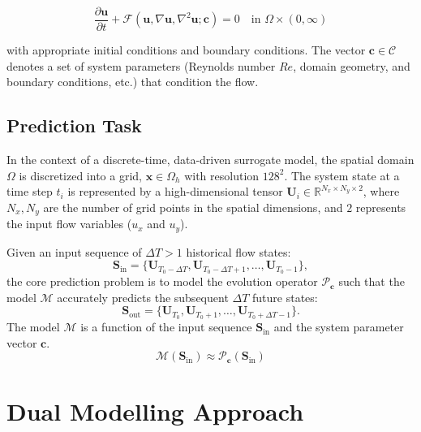 \begin{equation}
	\frac{\partial \mathbf{u}}{\partial t} + \mathcal{F}(\mathbf{u}, \nabla \mathbf{u}, \nabla^2 \mathbf{u}; \mathbf{c}) = 0 \quad \text{in } \Omega \times (0, \infty)
\end{equation}

with appropriate initial conditions and boundary conditions. The vector $\mathbf{c} \in \mathcal{C}$ denotes a set of system parameters (Reynolds number $Re$, domain geometry, and boundary conditions, etc.) that condition the flow.

\subsection{Prediction Task}

In the context of a discrete-time, data-driven surrogate model, the spatial domain $\Omega$ is discretized into a grid, $\mathbf{x} \in \Omega_h$ with resolution $128^2$. The system state at a time step $t_i$ is represented by a high-dimensional tensor $\mathbf{U}_i \in \mathbb{R}^{N_x \times N_y \times 2}$, where $N_x, N_y$ are the number of grid points in the spatial dimensions, and $2$ represents the input flow variables ($u_x$ and $u_y$).

Given an input sequence of $\Delta T > 1$ historical flow states:
\begin{equation}
\mathbf{S}_{\text{in}} = \{ \mathbf{U}_{T_0-\Delta T}, \mathbf{U}_{T_0-\Delta T+1}, \ldots, \mathbf{U}_{T_0-1} \},
\end{equation}
the core prediction problem is to model the evolution operator $\mathcal{P}_{\mathbf{c}}$ such that the model $\mathcal{M}$ accurately predicts the subsequent $\Delta T$ future states:
\begin{equation}
\mathbf{S}_{\text{out}} = \{ \mathbf{U}_{T_0}, \mathbf{U}_{T_0+1}, \ldots, \mathbf{U}_{T_0+\Delta T-1} \}.
\end{equation}
The model $\mathcal{M}$ is a function of the input sequence $\mathbf{S}_{\text{in}}$ and the system parameter vector $\mathbf{c}$.
\begin{equation}
\mathcal{M}(\mathbf{S}_{\text{in}}) \approx \mathcal{P}_{\mathbf{c}}(\mathbf{S}_{\text{in}})
\end{equation}

\section{Dual Modelling Approach}

